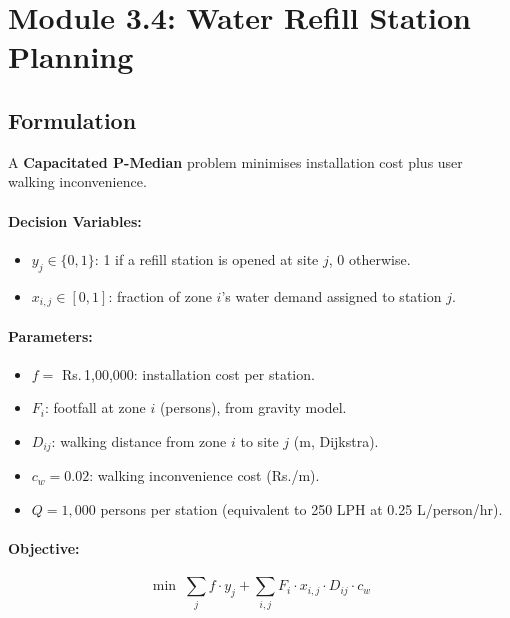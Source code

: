 \documentclass[11pt,a4paper]{article}
\begin{document}
\section{Module 3.4: Water Refill Station Planning}
\label{sec:mod34}

\subsection{Formulation}

A \textbf{Capacitated P-Median} problem minimises installation cost plus user walking inconvenience.

\paragraph{Decision Variables:}
\begin{itemize}
    \item $y_j \in \{0,1\}$: 1 if a refill station is opened at site $j$, 0 otherwise.
    \item $x_{i,j} \in [0,1]$: fraction of zone $i$'s water demand assigned to station $j$.
\end{itemize}

\paragraph{Parameters:}
\begin{itemize}
    \item $f = $ Rs.\,1,00,000: installation cost per station.
    \item $F_i$: footfall at zone $i$ (persons), from gravity model.
    \item $D_{ij}$: walking distance from zone $i$ to site $j$ (m, Dijkstra).
    \item $c_w = 0.02$: walking inconvenience cost (Rs./m).
    \item $Q = 1{,}000$ persons per station (equivalent to 250 LPH at 0.25 L/person/hr).
\end{itemize}

\paragraph{Objective:}
\begin{equation}
    \min \; \sum_j f \cdot y_j + \sum_{i,j} F_i \cdot x_{i,j} \cdot D_{ij} \cdot c_w
\end{equation}
\end{document}
